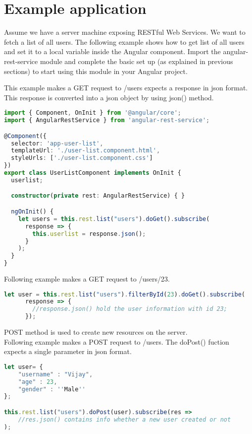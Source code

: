\section{Example application}

\hspace{0.2in}Assume we have a server machine exposing RESTful Web Services. We want to fetch a list of all users. The following example shows how to get list of all users and set it to a local variable inside the Angular component. 
Import the angular-rest-service module and complete the basic set up (as explained in previous sections) to start using this module in your Angular project.

\hspace{0.2in}This example makes a GET request to /users expects a response in json format. This response is converted into a json object by using json() method. 

\begin{lstlisting}[language=Typescript]
import { Component, OnInit } from '@angular/core';
import { AngularRestService } from 'angular-rest-service';

@Component({
  selector: 'app-user-list',
  templateUrl: './user-list.component.html',
  styleUrls: ['./user-list.component.css']
})
export class UserListComponent implements OnInit {
  userlist;

  constructor(private rest: AngularRestService) { }

  ngOnInit() {
    let users = this.rest.list("users").doGet().subscribe(
      response => {
        this.userlist = response.json();
      } 
    );
  }
}
\end{lstlisting}

Following example makes a GET request to /users/23.

\begin{lstlisting}[language=Typescript]
let user = this.rest.list("users").filterById(23).doGet().subscribe(
      response => {
        //response.json() hold the user information with id 23;
      });
\end{lstlisting}

POST method is used to create new resources on the server.\\
Following example makes a POST request to /users. The doPost() fuction expects a single parameter in json format.
\begin{lstlisting}[language=Typescript]
let user= {
	"username" : "Vijay",
	"age" : 23,
	"gender" : ''Male''
};

this.rest.list("users").doPost(user).subscribe(res => 
	//res.json() contains info whether a new user created or not
);
\end{lstlisting}


